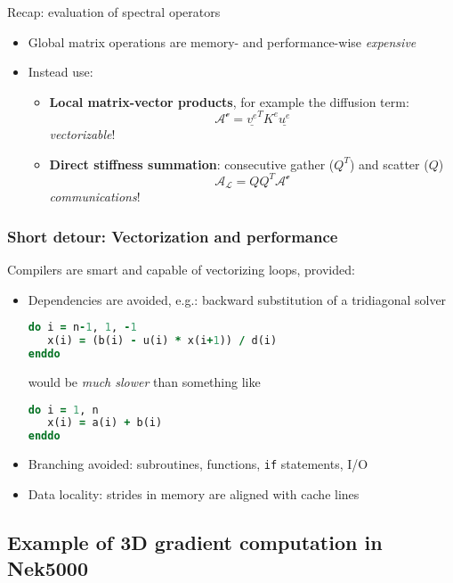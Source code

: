 \documentclass[
  a4paper,
  10pt]{article}
\newcommand{\passthrough}[1]{#1}
\providecommand{\tightlist}{%
  \setlength{\itemsep}{0pt}\setlength{\parskip}{0pt}}
\begin{document}
Recap: evaluation of spectral operators

\begin{itemize}
\tightlist
\item
  Global matrix operations are memory- and performance-wise
  \emph{expensive}
\item
  Instead use:

  \begin{itemize}
  \tightlist
  \item
    \textbf{Local matrix-vector products}, for example the diffusion
    term: \[\mathcal{A^e}=\underline{v^e}^{T}K^e\underline{u^e}\]
    \emph{vectorizable}!
  \item
    \textbf{Direct stiffness summation}: consecutive gather (\(Q^T\))
    and scatter (\(Q\)) \[\mathcal{A_L} = Q Q^T \mathcal{A^e}\]
    \emph{communications}!
  \end{itemize}
\end{itemize}

\hypertarget{short-detour-vectorization-and-performance}{%
\subsubsection{Short detour: Vectorization and
performance}\label{short-detour-vectorization-and-performance}}

Compilers are smart and capable of vectorizing loops, provided:

\begin{itemize}
\item
  Dependencies are avoided, e.g.: backward substitution of a tridiagonal
  solver

\begin{lstlisting}[language=Fortran]
do i = n-1, 1, -1
   x(i) = (b(i) - u(i) * x(i+1)) / d(i)
enddo
\end{lstlisting}

  would be \emph{much slower} than something like

\begin{lstlisting}[language=Fortran]
do i = 1, n
   x(i) = a(i) + b(i)
enddo
\end{lstlisting}
\item
  Branching avoided: subroutines, functions,
  \passthrough{\lstinline!if!} statements, I/O
\item
  Data locality: strides in memory are aligned with cache lines
\end{itemize}

\hypertarget{example-of-3d-gradient-computation-in-nek5000}{%
\subsection{Example of 3D gradient computation in
Nek5000}\label{example-of-3d-gradient-computation-in-nek5000}}
\end{document}
